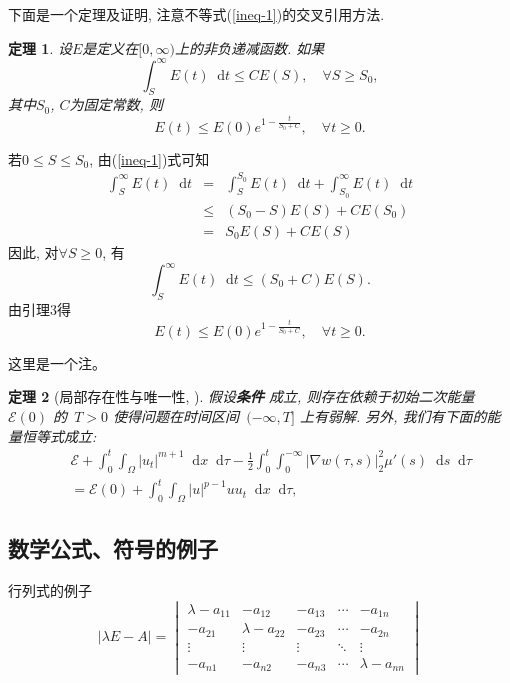 \documentclass[UTF8,oneside,12pt]{article}  %
\makeatletter
\theoremstyle{DingLi1}
\numberwithin{equation}{section}
\newtheorem{theorem}{\hspace{2em}定理}[section]
\newtheorem{remark}{\hskip 2em 注}[section]
\theoremstyle{DingLi2}
\renewenvironment{proof}[1][\proofname]{\par%
\pushQED{\qed}%
\normalfont \topsep6\p@\@plus6\p@\relax%
\trivlist%
\item[\hskip\labelsep%
#1]\ignorespaces%
}{%
\popQED\endtrivlist\@endpefalse%
}
\renewcommand{\proofname}{\heiti{证明}}%
\def\d{\mathop{}\!\mathrm{d}} %
\makeatother
\begin{document}
下面是一个定理及证明, 注意不等式(\ref{ineq-1})的交叉引用方法.
\begin{theorem}
设$E$是定义在$[0,\infty)$上的非负递减函数. 如果
\begin{equation}\label{ineq-1}  %
\int_S^{\infty} E(t) \d t \leq CE(S),\quad \forall S\geq S_0,
\end{equation}
其中$S_0$, $C$为固定常数, 则
$$E(t)\leq E(0)e^{1-\frac{t}{S_0+C}},\quad \forall t\geq 0.$$
\end{theorem}

\begin{proof}
若$0\leq S\leq S_0$, 由(\ref{ineq-1})式可知
\begin{eqnarray*}
  \int_S^{\infty} E(t)\d t &=& \int_S^{S_0} E(t)\d t +\int_{S_0}^{\infty} E(t)\d t\\
  &\leq &(S_0-S) E(S)+CE(S_0)\\
 &= &S_0 E(S) +CE(S)
\end{eqnarray*}
因此, 对$\forall S\geq 0$, 有
$$\int_S^{\infty} E(t) \d t \leq  (S_0+C)E(S).$$
由引理3得
$$E(t)\leq E(0)e^{1-\frac{t}{S_0+C}},\quad \forall t\geq 0.$$
\end{proof}
\begin{remark}
这里是一个注。
\end{remark}

\begin{theorem}[局部存在性与唯一性, \cite{Liang-Xu-Auto18}]  \label{Thm: local existence}
 假设\textbf{条件} 成立, 则存在依赖于初始二次能量~$\mathscr{E}(0)$ 的~$T>0$ 使得问题在时间区间~$(-\infty, T]$ 上有弱解. 另外, 我们有下面的能量恒等式成立:
\begin{eqnarray}
&&\mathscr{E}+\int_0^t\int_\Omega |u_t|^{m+1} \d x\d \tau-\frac12 \int_0^t\int_0^{-\infty}|\nabla w(\tau,s)|_2^2 \mu'(s)\d s\d \tau\nonumber\\
&&=\mathscr{E}(0)+\int_0^t\int_\Omega |u|^{p-1}uu_t\d x\d\tau,\label{4 quadratic energy identity}
\end{eqnarray}
\end{theorem}

\subsection{数学公式、符号的例子}

行列式的例子
\begin{equation*}
  |\lambda E- A|=
  \begin{vmatrix}
   \lambda-a_{11} & -a_{12} & -a_{13}&\cdots &-a_{1n} \\
    -a_{21} & \lambda-a_{22} & -a_{23} &\cdots & -a_{2n}\\
    \vdots & \vdots & \vdots&\ddots&\vdots \\
    -a_{n1} & -a_{n2} & -a_{n3} &\cdots& \lambda -a_{nn}
 \end{vmatrix}
\end{equation*}
\end{document}
